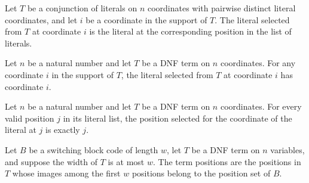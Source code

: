 \begin{theorem}
\label{FABL.DNFTerm.get_positionOfSupport}
\leanok
{}
Let $T$ be a conjunction of literals on $n$ coordinates with pairwise distinct literal
coordinates, and let $i$ be a coordinate in the support of $T$. The literal selected
from $T$ at coordinate $i$ is the literal at the corresponding position in the list of
literals.
\end{theorem}

\begin{theorem}
\label{FABL.DNFTerm.positionOfSupport_index}
\leanok
{}
Let $n$ be a natural number and let $T$ be a DNF term on $n$ coordinates. For any
coordinate $i$ in the support of $T$, the literal selected from $T$ at coordinate $i$
has coordinate $i$.
\end{theorem}

\begin{theorem}
\label{FABL.DNFTerm.positionOfSupport_literal}
\leanok
{}
Let $n$ be a natural number and let $T$ be a DNF term on $n$ coordinates. For every
valid position $j$ in its literal list, the position selected for the coordinate of the
literal at $j$ is exactly $j$.
\end{theorem}

\begin{definition}
\label{FABL.SwitchingBlockCode.termPositions}
\leanok
{}
Let $B$ be a switching block code of length $w$, let $T$ be a DNF term on $n$ variables,
and suppose the width of $T$ is at most $w$. The term positions are the positions in $T$
whose images among the first $w$ positions belong to the position set of $B$.
\end{definition}

